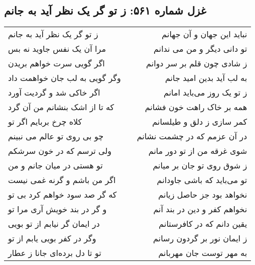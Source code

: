 \begin{center}
\section*{غزل شماره ۵۶۱: ز تو گر یک نظر آید به جانم}
\label{sec:561}
\begin{longtable}{l p{0.5cm} r}
ز تو گر یک نظر آید به جانم
&&
نباید این جهان و آن جهانم
\\
مرا آن یک نفس جاوید نه بس
&&
تو دانی دیگر و من می ندانم
\\
اگر گویی سرت خواهم بریدن
&&
ز شادی چون قلم بر سر دوانم
\\
وگر گویی به لب جان خواهمت داد
&&
به لب آید بدین امید جانم
\\
اگر خاکی شد و گردیت آورد
&&
ز تو یک روز می‌باید امانم
\\
که تا از اشک بنشانم من آن گرد
&&
همه بر خاک راهت خون فشانم
\\
کلاه چرخ بربایم اگر تو
&&
کمر سازی ز دلق و طیلسانم
\\
چو بی روی تو عالم می نبینم
&&
در آن عزمم که در چشمت نشانم
\\
ولی ترسم که در خون سرشکم
&&
شوی غرقه من از تو دور مانم
\\
تو هستی در میان جانم و من
&&
ز شوق روی تو جان بر میانم
\\
اگر من باشم و گرنه غمی نیست
&&
تو می‌باید که باشی جاودانم
\\
که گر صد سود خواهم کرد بی تو
&&
نخواهد بود جز حاصل زیانم
\\
و گر در بند خویش آری مرا تو
&&
نخواهم کفر و دین در بند آنم
\\
در ایمان گر نیابم از تو بویی
&&
یقین دانم که در کافرستانم
\\
وگر در کفر بویی یابم از تو
&&
ز ایمان نور بر گردون رسانم
\\
تو تا دل برده‌ای جانا ز عطار
&&
به مهر توست جان مهربانم
\\
\end{longtable}
\end{center}
